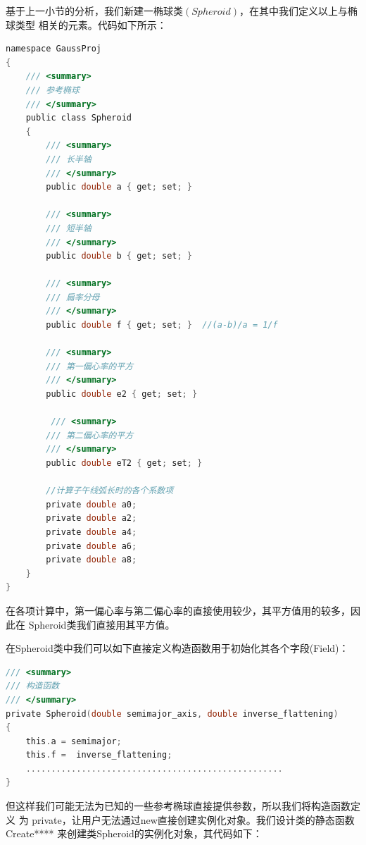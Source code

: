 基于上一小节的分析，我们新建一椭球类$(Spheroid)$，在其中我们定义以上与椭球类型
相关的元素。代码如下所示：

\begin{lstlisting}[language=C]
namespace GaussProj
{
    /// <summary>
    /// 参考椭球
    /// </summary>
    public class Spheroid
    {
        /// <summary>
        /// 长半轴
        /// </summary>
        public double a { get; set; }

        /// <summary>
        /// 短半轴
        /// </summary>
        public double b { get; set; }

        /// <summary>
        /// 扁率分母
        /// </summary>
        public double f { get; set; }  //(a-b)/a = 1/f

        /// <summary>
        /// 第一偏心率的平方
        /// </summary>
        public double e2 { get; set; }

         /// <summary>
        /// 第二偏心率的平方
        /// </summary>
        public double eT2 { get; set; }

        //计算子午线弧长时的各个系数项
        private double a0;
        private double a2;
        private double a4;
        private double a6;
        private double a8;
    }
}
\end{lstlisting}

在各项计算中，第一偏心率与第二偏心率的直接使用较少，其平方值用的较多，因此在
Spheroid类我们直接用其平方值。

 在Spheroid类中我们可以如下直接定义构造函数用于初始化其各个字段(Field)：
  \begin{lstlisting}[language=C]
/// <summary>
/// 构造函数
/// </summary>
private Spheroid(double semimajor_axis, double inverse_flattening)
{
    this.a = semimajor;
    this.f =  inverse_flattening;
    ...................................................
}
\end{lstlisting}

但这样我们可能无法为已知的一些参考椭球直接提供参数，所以我们将构造函数定义
为 private，让用户无法通过new直接创建实例化对象。我们设计类的静态函数
Create**** 来创建类Spheroid的实例化对象，其代码如下：

